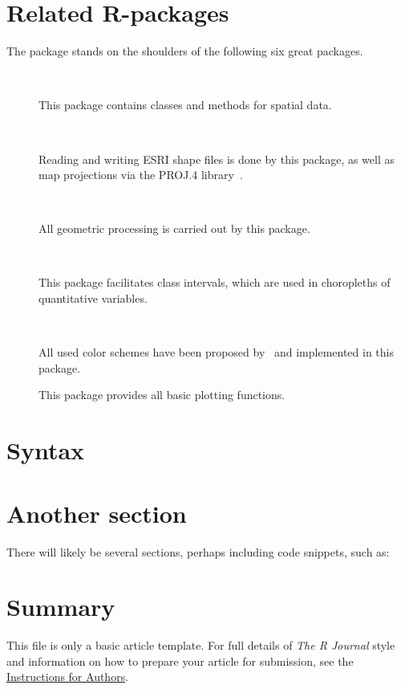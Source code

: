 \section{Related R-packages}



The  package stands on the shoulders of the following six great packages.

\begin{description}
\item[~\citep{sp1, sp2}] This package contains classes and methods for spatial data.
\item[~\citep{rgdal}] Reading and writing ESRI shape files is done by this package, as well as map projections via the PROJ.4 library~\citep{proj4}.
\item[~\citep{rgeos}] All geometric processing is carried out by this package.
\item[~\citep{classInt}] This package facilitates class intervals, which are used in choropleths of quantitative variables.
\item[~\citep{classInt}] All used color schemes have been proposed by~\citet{brewer03} and implemented in this package.
\item[] This package provides all basic plotting functions.
\end{description}







\section{Syntax}\label{syntax}


%

\section{Another section}

There will likely be several sections, perhaps including code snippets, such as:


\section{Summary}

This file is only a basic article template. For full details of \emph{The R Journal} style and information on how to prepare your article for submission, see the \href{http://journal.r-project.org/latex/RJauthorguide.pdf}{Instructions for Authors}.


\address{Martijn Tennekes\\
  Statistics Netherlands\\
  CBS-Weg 11, 6412 EX Heerlen\\
  Netherlands\\}


